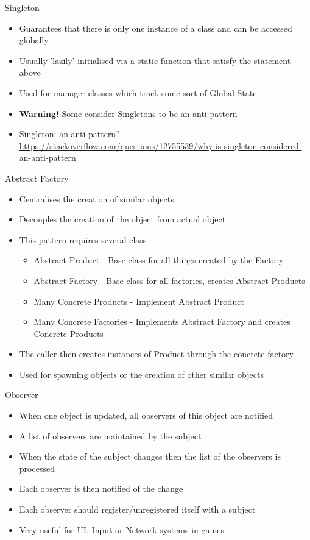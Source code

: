 \begin{frame}{Singleton}
	\begin{itemize}
		\item Guarantees that there is only one instance of a class and can be accessed globally
		\item Usually 'lazily' initialised via a static function that satisfy the statement above
		\item Used for manager classes which track some sort of Global State
		\item \textbf{Warning!} Some consider Singletons to be an anti-pattern
		\item Singleton: an anti-pattern? - \url{https://stackoverflow.com/questions/12755539/why-is-singleton-considered-an-anti-pattern}
	\end{itemize}
\end{frame}


\begin{frame}{Abstract Factory}
	\begin{itemize}
		\item Centralises the creation of similar objects
		\item Decouples the creation of the object from actual object
		\item This pattern requires several class
		\begin{itemize}
			\item Abstract Product - Base class for all things created by the Factory
			\item Abstract Factory - Base class for all factories, creates Abstract Products
			\item Many Concrete Products - Implement Abstract Product
			\item Many Concrete Factories - Implements Abstract Factory and creates Concrete Products 
		\end{itemize}
		\item The caller then creates instances of Product through the concrete factory
		\item Used for spawning objects or the creation of other similar objects
	\end{itemize}
\end{frame}

\begin{frame}{Observer}
	\begin{itemize}
		\item When one object is updated, all observers of this object are notified
		\item A list of observers are maintained by the subject
		\item When the state of the subject changes then the list of the observers is processed
		\item Each observer is then notified of the change
		\item Each observer should register/unregistered itself with a subject 
		\item Very useful for UI, Input or Network systems in games
	\end{itemize}
\end{frame}

